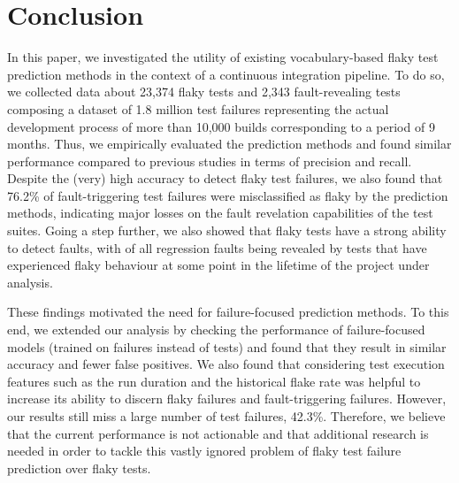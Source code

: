 \section{Conclusion}
\label{sec:chromium-conclusion}


In this paper, we investigated the utility of existing vocabulary-based flaky test prediction methods in the context of a continuous integration pipeline. To do so, we collected data about 23,374 flaky tests and 2,343 fault-revealing tests composing a dataset of 1.8 million test failures representing the actual development process of more than 10,000 builds corresponding to a period of 9 months. Thus, we empirically evaluated the prediction methods and found similar performance compared to previous studies in terms of precision and recall. Despite the (very) high accuracy to detect flaky test failures, we also found that 76.2\% of fault-triggering test failures were misclassified as flaky by the prediction methods, indicating major losses on the fault revelation capabilities of the test suites. Going a step further, we also showed that flaky tests have a strong ability to detect faults, with  of all regression faults being revealed by tests that have experienced flaky behaviour at some point in the lifetime of the project under analysis.

These findings motivated the need for failure-focused prediction methods. To this end, we extended our analysis by checking the performance of failure-focused models (trained on failures instead of tests) and found that they result in similar accuracy and fewer false positives. We also found that considering test execution features such as the run duration and the historical flake rate was helpful to increase its ability to discern flaky failures and fault-triggering failures. However, our results still miss a large number of test failures, 42.3\%. Therefore, we believe that the current performance is not actionable and that additional research is needed in order to tackle this vastly ignored problem of flaky test failure prediction over flaky tests.



